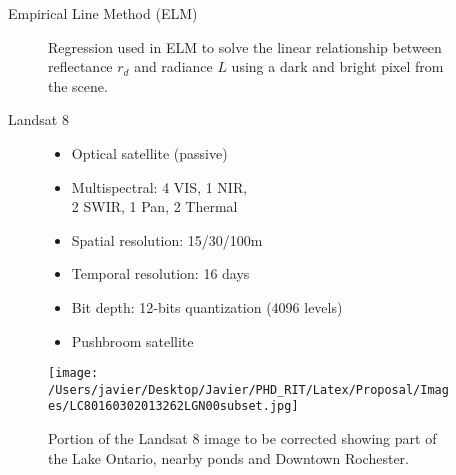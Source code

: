 \documentclass{beamer}
\begin{document}
\begin{frame}{}
\begin{columns}[t]
\begin{column}{.3\linewidth}
\begin{block}{Empirical Line Method (ELM)}
\begin{figure}[htb]
{
  }%
\caption{Regression used in ELM to solve the linear relationship between reflectance $r_d$ and radiance $L$ using a dark and bright pixel from the scene. \label{fig:ELM}}
\end{figure}
\vspace{-.5cm}
\end{block}
\begin{block}{Landsat 8}
\begin{figure}[htb]
\begin{minipage}[c]{0.48\linewidth}
\small
\begin{itemize}
	\item Optical satellite (passive)
	\vspace{.2cm}
	\item Multispectral: 4 VIS, 1 NIR, \\2 SWIR, 1 Pan, 2 Thermal
	\vspace{.2cm}
	\item Spatial resolution: 15/30/100m
	\vspace{.2cm}
	\item Temporal resolution: 16 days
	\vspace{.2cm}
	\item Bit depth: 12-bits quantization (4096 levels)
	\vspace{.2cm}
	\item Pushbroom satellite
\end{itemize}
\end{minipage}
\hfill
\begin{minipage}[c]{0.48\linewidth}

  	\centering
  	\texttt{[image: /Users/javier/Desktop/Javier/PHD\_RIT/Latex/Proposal/Images/LC80160302013262LGN00subset.jpg]}
  \caption{Portion of the Landsat 8 image to be corrected showing part of the Lake Ontario, nearby ponds and Downtown Rochester. \label{fig:Scene} } 

\end{minipage}
\end{figure}
\vspace{-.5cm}
\end{block}
\end{column}   
 \begin{column}{.3\linewidth}  %


\end{column}
\end{columns}
\end{frame}
\end{document}
